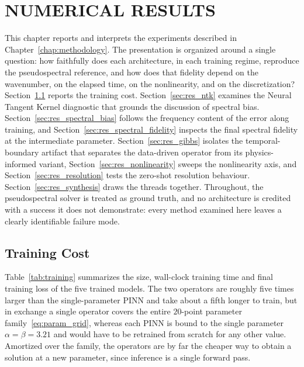\chapter{NUMERICAL RESULTS}
\label{chap:results}

This chapter reports and interprets the experiments described in Chapter~\ref{chap:methodology}. The presentation is organized around a single question: how faithfully does each architecture, in each training regime, reproduce the pseudospectral reference, and how does that fidelity depend on the wavenumber, on the elapsed time, on the nonlinearity, and on the discretization? Section~\ref{sec:res_training} reports the training cost. Section~\ref{sec:res_ntk} examines the Neural Tangent Kernel diagnostic that grounds the discussion of spectral bias. Section~\ref{sec:res_spectral_bias} follows the frequency content of the error along training, and Section~\ref{sec:res_spectral_fidelity} inspects the final spectral fidelity at the intermediate parameter. Section~\ref{sec:res_gibbs} isolates the temporal-boundary artifact that separates the data-driven operator from its physics-informed variant, Section~\ref{sec:res_nonlinearity} sweeps the nonlinearity axis, and Section~\ref{sec:res_resolution} tests the zero-shot resolution behaviour. Section~\ref{sec:res_synthesis} draws the threads together. Throughout, the pseudospectral solver is treated as ground truth, and no architecture is credited with a success it does not demonstrate: every method examined here leaves a clearly identifiable failure mode.

\section{Training Cost}
\label{sec:res_training}

Table~\ref{tab:training} summarizes the size, wall-clock training time and final training loss of the five trained models. The two operators are roughly five times larger than the single-parameter PINN and take about a fifth longer to train, but in exchange a single operator covers the entire $20$-point parameter family~\eqref{eq:param_grid}, whereas each PINN is bound to the single parameter $\alpha = \beta = 3.21$ and would have to be retrained from scratch for any other value. Amortized over the family, the operators are by far the cheaper way to obtain a solution at a new parameter, since inference is a single forward pass.

